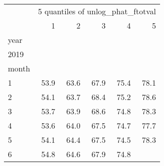 \begin{tabular}{llllll}
\cline{1-6}
\multicolumn{1}{c}{} &
  \multicolumn{5}{|c}{5 quantiles of unlog\_phat\_ftotval} \\
\multicolumn{1}{c}{} &
  \multicolumn{1}{|r}{1} &
  \multicolumn{1}{r}{2} &
  \multicolumn{1}{r}{3} &
  \multicolumn{1}{r}{4} &
  \multicolumn{1}{r}{5} \\
\cline{1-6}
\multicolumn{1}{l}{year} &
  \multicolumn{1}{|r}{} &
  \multicolumn{1}{r}{} &
  \multicolumn{1}{r}{} &
  \multicolumn{1}{r}{} &
  \multicolumn{1}{r}{} \\
\multicolumn{1}{l}{\hspace{1em}2019} &
  \multicolumn{1}{|r}{} &
  \multicolumn{1}{r}{} &
  \multicolumn{1}{r}{} &
  \multicolumn{1}{r}{} &
  \multicolumn{1}{r}{} \\
\multicolumn{1}{l}{\hspace{2em}month} &
  \multicolumn{1}{|r}{} &
  \multicolumn{1}{r}{} &
  \multicolumn{1}{r}{} &
  \multicolumn{1}{r}{} &
  \multicolumn{1}{r}{} \\
\multicolumn{1}{l}{\hspace{3em}1} &
  \multicolumn{1}{|r}{53.9} &
  \multicolumn{1}{r}{63.6} &
  \multicolumn{1}{r}{67.9} &
  \multicolumn{1}{r}{75.4} &
  \multicolumn{1}{r}{78.1} \\
\multicolumn{1}{l}{\hspace{3em}2} &
  \multicolumn{1}{|r}{54.1} &
  \multicolumn{1}{r}{63.7} &
  \multicolumn{1}{r}{68.4} &
  \multicolumn{1}{r}{75.2} &
  \multicolumn{1}{r}{78.6} \\
\multicolumn{1}{l}{\hspace{3em}3} &
  \multicolumn{1}{|r}{53.7} &
  \multicolumn{1}{r}{63.9} &
  \multicolumn{1}{r}{68.6} &
  \multicolumn{1}{r}{74.8} &
  \multicolumn{1}{r}{78.3} \\
\multicolumn{1}{l}{\hspace{3em}4} &
  \multicolumn{1}{|r}{53.6} &
  \multicolumn{1}{r}{64.0} &
  \multicolumn{1}{r}{67.5} &
  \multicolumn{1}{r}{74.7} &
  \multicolumn{1}{r}{77.7} \\
\multicolumn{1}{l}{\hspace{3em}5} &
  \multicolumn{1}{|r}{54.1} &
  \multicolumn{1}{r}{64.4} &
  \multicolumn{1}{r}{67.5} &
  \multicolumn{1}{r}{74.5} &
  \multicolumn{1}{r}{78.3} \\
\multicolumn{1}{l}{\hspace{3em}6} &
  \multicolumn{1}{|r}{54.8} &
  \multicolumn{1}{r}{64.6} &
  \multicolumn{1}{r}{67.9} &
  \multicolumn{1}{r}{74.8} &

\end{tabular}
